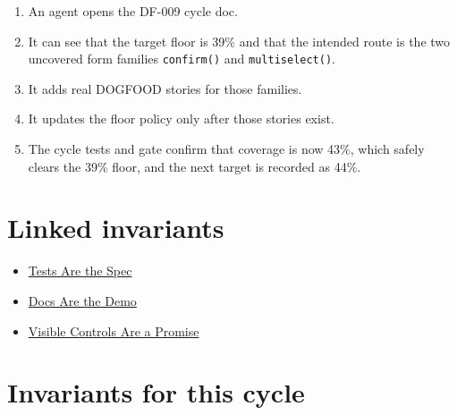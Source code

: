 \begin{enumerate}
\def\labelenumi{\arabic{enumi}.}
\tightlist
\item
  An agent opens the DF-009 cycle doc.
\item
  It can see that the target floor is 39\% and that the intended route is the two uncovered form families \texttt{c\allowbreak{}o\allowbreak{}n\allowbreak{}f\allowbreak{}i\allowbreak{}r\allowbreak{}m\allowbreak{}(\allowbreak{})} and \texttt{m\allowbreak{}u\allowbreak{}l\allowbreak{}t\allowbreak{}i\allowbreak{}s\allowbreak{}e\allowbreak{}l\allowbreak{}e\allowbreak{}c\allowbreak{}t\allowbreak{}(\allowbreak{})}.
\item
  It adds real DOGFOOD stories for those families.
\item
  It updates the floor policy only after those stories exist.
\item
  The cycle tests and gate confirm that coverage is now 43\%, which safely clears the 39\% floor, and the next target is recorded as 44\%.
\end{enumerate}

\section{Linked invariants}\label{record-071-linked-invariants}

\begin{itemize}
\tightlist
\item
  \href{https://github.com/flyingrobots/bijou/blob/cbd70612140e7a450d764b3c7be1c6af878b99bc/docs/invariants/tests-are-the-spec.md}{Tests Are the Spec}
\item
  \href{https://github.com/flyingrobots/bijou/blob/cbd70612140e7a450d764b3c7be1c6af878b99bc/docs/invariants/docs-are-the-demo.md}{Docs Are the Demo}
\item
  \href{https://github.com/flyingrobots/bijou/blob/cbd70612140e7a450d764b3c7be1c6af878b99bc/docs/invariants/visible-controls-are-a-promise.md}{Visible Controls Are a Promise}
\end{itemize}

\section{Invariants for this cycle}\label{record-071-invariants-for-this-cycle}

